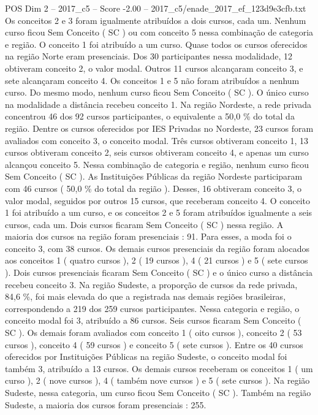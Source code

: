 \begin{textsample}{POS Dim 2 – 2017\_c5 – Score -2.00 – 2017\_c5/enade\_2017\_ef\_123d9e3cfb.txt}
Os conceitos 2 e 3 foram igualmente atribuídos a dois cursos, cada um.
Nenhum curso ficou Sem Conceito ( SC ) ou com conceito 5 nessa combinação de categoria e região.
O conceito 1 foi atribuído a um curso.
Quase todos os cursos oferecidos na região Norte eram presenciais.
Dos 30 participantes nessa modalidade, 12 obtiveram conceito 2, o valor modal.
Outros 11 cursos alcançaram conceito 3, e sete alcançaram conceito 4.
Os conceitos 1 e 5 não foram atribuídos a nenhum curso.
Do mesmo modo, nenhum curso ficou Sem Conceito ( SC ).
O único curso na modalidade a distância recebeu conceito 1.
Na região Nordeste, a rede privada concentrou 46 dos 92 cursos participantes, o equivalente a 50,0 \% do total da região.
Dentre os cursos oferecidos por IES Privadas no Nordeste, 23 cursos foram avaliados com conceito 3, o conceito modal.
Três cursos obtiveram conceito 1, 13 cursos obtiveram conceito 2, seis cursos obtiveram conceito 4, e apenas um curso alcançou conceito 5.
Nessa combinação de categoria e região, nenhum curso ficou Sem Conceito ( SC ).
As Instituições Públicas da região Nordeste participaram com 46 cursos ( 50,0 \% do total da região ).
Desses, 16 obtiveram conceito 3, o valor modal, seguidos por outros 15 cursos, que receberam conceito 4.
O conceito 1 foi atribuído a um curso, e os conceitos 2 e 5 foram atribuídos igualmente a seis cursos, cada um.
Dois cursos ficaram Sem Conceito ( SC ) nessa região.
A maioria dos cursos na região foram presenciais : 91.
Para esses, a moda foi o conceito 3, com 38 cursos.
Os demais cursos presenciais da região foram alocados aos conceitos 1 ( quatro cursos ), 2 ( 19 cursos ), 4 ( 21 cursos ) e 5 ( sete cursos ).
Dois cursos presenciais ficaram Sem Conceito ( SC ) e o único curso a distância recebeu conceito 3.
Na região Sudeste, a proporção de cursos da rede privada, 84,6 \%, foi mais elevada do que a registrada nas demais regiões brasileiras, correspondendo a 219 dos 259 cursos participantes.
Nessa categoria e região, o conceito modal foi 3, atribuído a 86 cursos.
Seis cursos ficaram Sem Conceito ( SC ).
Os demais foram avaliados com conceito 1 ( oito cursos ), conceito 2 ( 53 cursos ), conceito 4 ( 59 cursos ) e conceito 5 ( sete cursos ).
Entre os 40 cursos oferecidos por Instituições Públicas na região Sudeste, o conceito modal foi também 3, atribuído a 13 cursos.
Os demais cursos receberam os conceitos 1 ( um curso ), 2 ( nove cursos ), 4 ( também nove cursos ) e 5 ( sete cursos ).
Na região Sudeste, nessa categoria, um curso ficou Sem Conceito ( SC ).
Também na região Sudeste, a maioria dos cursos foram presenciais : 255.

\end{textsample}
